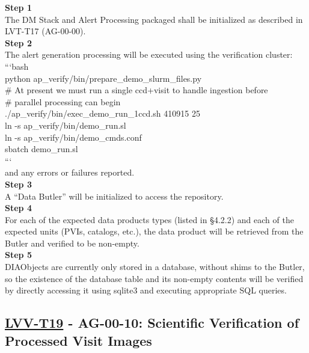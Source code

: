 \textbf{Step 1}\\
The DM Stack and Alert Processing packaged shall be initialized as
described in LVT-T17 (AG-00-00).\\[2\baselineskip]\textbf{Step 2}\\
The alert generation processing will be executed using the verification
cluster:\\[2\baselineskip]```bash\\
python ap\_verify/bin/prepare\_demo\_slurm\_files.py\\
\# At present we must run a single ccd+visit to handle ingestion
before\\
\# parallel processing can begin\\
./ap\_verify/bin/exec\_demo\_run\_1ccd.sh 410915 25\\
ln -s ap\_verify/bin/demo\_run.sl\\
ln -s ap\_verify/bin/demo\_cmds.conf\\
sbatch demo\_run.sl\\
```\\[2\baselineskip]and any errors or failures
reported.\\[2\baselineskip]\textbf{Step 3}\\
A ``Data Butler'' will be initialized to access the
repository.\\[2\baselineskip]\textbf{Step 4}\\
For each of the expected data products types (listed in §4.2.2) and each
of the expected units (PVIs, catalogs, etc.), the data product will be
retrieved from the Butler and verified to be
non-empty.\\[2\baselineskip]\textbf{Step 5}\\
DIAObjects are currently only stored in a database, without shims to the
Butler, so the existence of the database table and its non-empty
contents will be verified by directly accessing it using sqlite3 and
executing appropriate SQL queries.\\[2\baselineskip]

\hypertarget{lvv-t19---ag-00-10-scientific-verification-of-processed-visit-images}{\subsection{\texorpdfstring{\href{https://jira.lsstcorp.org/secure/Tests.jspa\#/testCase/LVV-T19}{LVV-T19}
- AG-00-10: Scientific Verification of Processed Visit
Images}{LVV-T19 - AG-00-10: Scientific Verification of Processed Visit Images}}\label{lvv-t19---ag-00-10-scientific-verification-of-processed-visit-images}}


